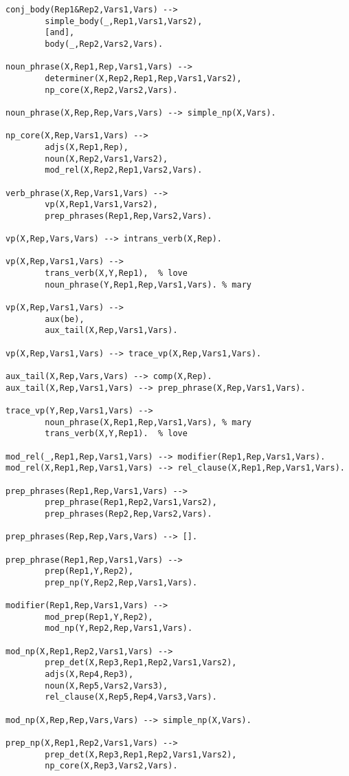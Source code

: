 \begin{verbatim}
conj_body(Rep1&Rep2,Vars1,Vars) -->
        simple_body(_,Rep1,Vars1,Vars2),
        [and],
        body(_,Rep2,Vars2,Vars).

noun_phrase(X,Rep1,Rep,Vars1,Vars) -->
        determiner(X,Rep2,Rep1,Rep,Vars1,Vars2),
        np_core(X,Rep2,Vars2,Vars).

noun_phrase(X,Rep,Rep,Vars,Vars) --> simple_np(X,Vars).

np_core(X,Rep,Vars1,Vars) -->
        adjs(X,Rep1,Rep),
        noun(X,Rep2,Vars1,Vars2),
        mod_rel(X,Rep2,Rep1,Vars2,Vars).

verb_phrase(X,Rep,Vars1,Vars) -->
        vp(X,Rep1,Vars1,Vars2),
        prep_phrases(Rep1,Rep,Vars2,Vars).

vp(X,Rep,Vars,Vars) --> intrans_verb(X,Rep).

vp(X,Rep,Vars1,Vars) -->
        trans_verb(X,Y,Rep1),  % love
        noun_phrase(Y,Rep1,Rep,Vars1,Vars). % mary

vp(X,Rep,Vars1,Vars) --> 
        aux(be),
        aux_tail(X,Rep,Vars1,Vars).

vp(X,Rep,Vars1,Vars) --> trace_vp(X,Rep,Vars1,Vars).

aux_tail(X,Rep,Vars,Vars) --> comp(X,Rep).
aux_tail(X,Rep,Vars1,Vars) --> prep_phrase(X,Rep,Vars1,Vars).

trace_vp(Y,Rep,Vars1,Vars) -->
        noun_phrase(X,Rep1,Rep,Vars1,Vars), % mary
        trans_verb(X,Y,Rep1).  % love

mod_rel(_,Rep1,Rep,Vars1,Vars) --> modifier(Rep1,Rep,Vars1,Vars).
mod_rel(X,Rep1,Rep,Vars1,Vars) --> rel_clause(X,Rep1,Rep,Vars1,Vars).

prep_phrases(Rep1,Rep,Vars1,Vars) -->
        prep_phrase(Rep1,Rep2,Vars1,Vars2),
        prep_phrases(Rep2,Rep,Vars2,Vars).

prep_phrases(Rep,Rep,Vars,Vars) --> [].

prep_phrase(Rep1,Rep,Vars1,Vars) -->
        prep(Rep1,Y,Rep2),
        prep_np(Y,Rep2,Rep,Vars1,Vars).

modifier(Rep1,Rep,Vars1,Vars) -->
        mod_prep(Rep1,Y,Rep2),
        mod_np(Y,Rep2,Rep,Vars1,Vars).

mod_np(X,Rep1,Rep2,Vars1,Vars) -->
        prep_det(X,Rep3,Rep1,Rep2,Vars1,Vars2),
        adjs(X,Rep4,Rep3),
        noun(X,Rep5,Vars2,Vars3),
        rel_clause(X,Rep5,Rep4,Vars3,Vars).

mod_np(X,Rep,Rep,Vars,Vars) --> simple_np(X,Vars).

prep_np(X,Rep1,Rep2,Vars1,Vars) -->
        prep_det(X,Rep3,Rep1,Rep2,Vars1,Vars2),
        np_core(X,Rep3,Vars2,Vars).


\end{verbatim}

